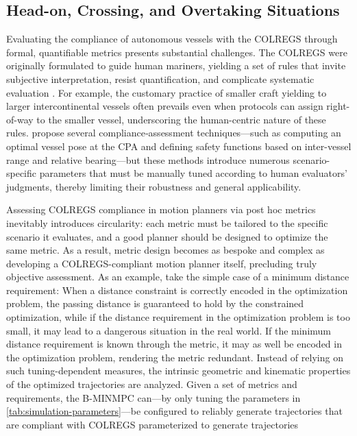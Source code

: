 \FloatBarrier
\subsection{Head-on, Crossing, and Overtaking Situations}
\label{sec:case-2-head-on}


Evaluating the compliance of autonomous vessels with the COLREGS through formal, quantifiable metrics presents substantial challenges. The COLREGS were originally formulated to guide human mariners, yielding a set of rules that invite subjective interpretation, resist quantification, and complicate systematic evaluation \citep{Woerner2018}.  For example, the customary practice of smaller craft yielding to larger intercontinental vessels often prevails even when protocols can assign right-of-way to the smaller vessel, underscoring the human-centric nature of these rules. \citet{Woerner2018} propose several compliance‐assessment techniques---such as computing an optimal vessel pose at the \acrshort{CPA} and defining safety functions based on inter-vessel range and relative bearing---but these methods introduce numerous scenario-specific parameters that must be manually tuned according to human evaluators' judgments, thereby limiting their robustness and general applicability.


Assessing COLREGS compliance in motion planners via post hoc metrics inevitably introduces circularity: each metric must be tailored to the specific scenario it evaluates, and a good planner should be designed to optimize the same metric. 
As a result, metric design becomes as bespoke and complex as developing a COLREGS-compliant motion planner itself, precluding truly objective assessment.  As an example, take the simple case of a minimum distance requirement: When a distance constraint is correctly encoded in the optimization problem, the passing distance is guaranteed to hold by the constrained optimization, while if the distance requirement in the optimization problem is too small, it may lead to a dangerous situation in the real world.  If the minimum distance requirement is known through the metric, it may as well be encoded in the optimization problem, rendering the metric redundant. 
Instead of relying on such tuning-dependent measures, the intrinsic geometric and kinematic properties of the optimized trajectories are analyzed.  Given a set of metrics and requirements, the B-MINMPC can---by only tuning the parameters in \cref{tab:simulation-parameters}---be configured to reliably generate trajectories that are compliant with COLREGS 
parameterized to generate trajectories

